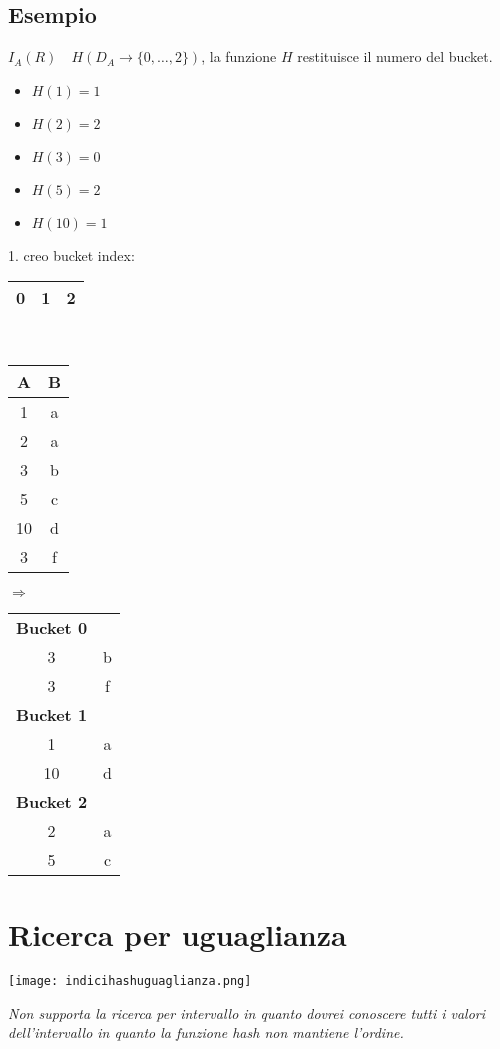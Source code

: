\documentclass[12pt]{article}
\begin{document}
\subsection*{Esempio}
$I_{A}(R) \quad H(D_{A}\rightarrow\{0,\ldots,2\})$, la funzione $H$ restituisce il numero del bucket.
\begin{itemize}
    \item $H(1)=1$
    \item $H(2)=2$
    \item $H(3)=0$
    \item $H(5)=2$
    \item $H(10)=1$
\end{itemize}
1. creo bucket index: 
\begin{tabular}{|c|c|c|}
    \hline
    0 & 1 & 2 \\
    \hline
\end{tabular}\\
\begin{tabular}{|c|c|}
    \hline
    A & B\\
    \hline
    1 & a \\
    2 & a \\
    3 & b \\
    5 & c \\
    10 & d \\
    3 & f \\
    \hline
\end{tabular} $\Rightarrow$
\begin{tabular}{|cc|}
    \hline
    \textbf{Bucket 0} & \hphantom{}\\
    3 & b\\
    3 & f \\
    \hline
    \textbf{Bucket 1} & \hphantom{}\\
    1 & a \\
    10 & d \\
    \hline
    \textbf{Bucket 2} & \hphantom{}\\
    2 & a \\
    5 & c \\
    \hline
\end{tabular}
\section{Ricerca per uguaglianza}
\begin{center}
    \texttt{[image: indicihashuguaglianza.png]}
\end{center}
\textit{Non supporta la ricerca per intervallo in quanto dovrei conoscere tutti i valori dell'intervallo in quanto la funzione hash non mantiene l'ordine.}
\end{document}
